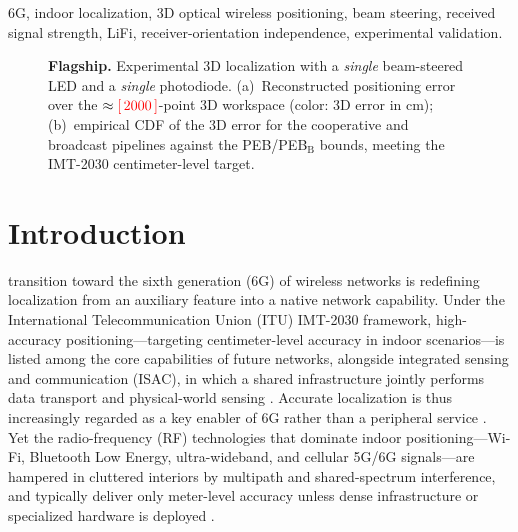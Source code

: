 \documentclass[journal]{IEEEtran}
\newcommand{\ph}[1]{\textcolor{red}{[\,#1\,]}}
\begin{document}
\begin{IEEEkeywords}
6G, indoor localization, 3D optical wireless positioning, beam steering, received signal strength, LiFi, receiver-orientation independence, experimental validation.
\end{IEEEkeywords}




\begin{figure}[!t]
    \centering
    \hfill
    \caption{\textcolor{figcol}{\textbf{Flagship.} Experimental 3D localization with a \emph{single} beam-steered LED and a \emph{single} photodiode. (a)~Reconstructed positioning error over the $\approx\ph{2000}$-point 3D workspace (color: 3D error in cm); (b)~empirical CDF of the 3D error for the cooperative and broadcast pipelines against the PEB/PEB$_\mathrm{B}$ bounds, meeting the IMT-2030 centimeter-level target.}}
    \label{fig:flagship}
\end{figure}

\section{Introduction}
 transition toward the sixth generation (6G) of wireless networks is redefining localization from an auxiliary feature into a native network capability. Under the International Telecommunication Union (ITU) IMT-2030 framework, high-accuracy positioning---targeting centimeter-level accuracy in indoor scenarios---is listed among the core capabilities of future networks, alongside integrated sensing and communication (ISAC), in which a shared infrastructure jointly performs data transport and physical-world sensing \cite{ITU2023IMT2030, LiuF2022ISAC}. Accurate localization is thus increasingly regarded as a key enabler of 6G rather than a peripheral service \cite{Trevlakis2023}. Yet the radio-frequency (RF) technologies that dominate indoor positioning---Wi-Fi, Bluetooth Low Energy, ultra-wideband, and cellular 5G/6G signals---are hampered in cluttered interiors by multipath and shared-spectrum interference, and typically deliver only meter-level accuracy unless dense infrastructure or specialized hardware is deployed \cite{Italiano2025, Trevlakis2023}.
\end{document}
